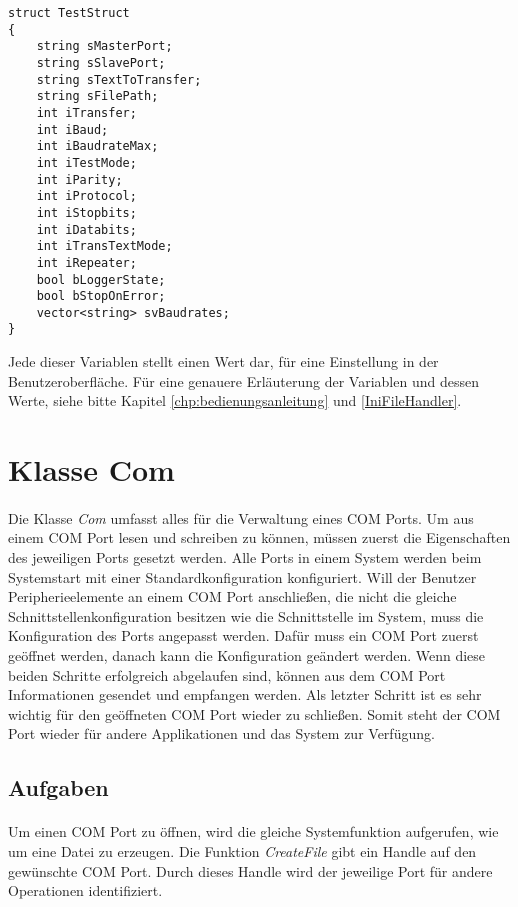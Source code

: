 \begin{lstlisting}	 
struct TestStruct
{
	string sMasterPort;
	string sSlavePort;
	string sTextToTransfer;
	string sFilePath;
	int iTransfer;
	int iBaud;
	int iBaudrateMax;
	int iTestMode;
	int iParity;
	int iProtocol;
	int iStopbits;
	int iDatabits;
	int iTransTextMode;
	int iRepeater;
	bool bLoggerState;
	bool bStopOnError;
	vector<string> svBaudrates;
}
\end{lstlisting}

Jede dieser Variablen stellt einen Wert dar, für eine Einstellung in der Benutzeroberfläche. Für eine genauere Erläuterung der Variablen und dessen Werte, siehe bitte Kapitel \ref{chp:bedienungsanleitung} und \ref{IniFileHandler}.

\newpage


\section{Klasse Com}
\paragraph{}
Die Klasse \textit{Com} umfasst alles für die Verwaltung eines COM Ports. Um aus einem COM Port lesen und schreiben zu können, müssen zuerst die Eigenschaften des jeweiligen Ports gesetzt werden. Alle Ports in einem System werden beim Systemstart mit einer Standardkonfiguration konfiguriert. Will der Benutzer Peripherieelemente an einem COM Port anschließen, die nicht die gleiche Schnittstellenkonfiguration besitzen wie die Schnittstelle im System, muss die Konfiguration des Ports angepasst werden. Dafür muss ein COM Port zuerst geöffnet werden, danach kann die Konfiguration geändert werden. Wenn diese beiden Schritte erfolgreich abgelaufen sind, können aus dem COM Port Informationen gesendet und empfangen werden. Als letzter Schritt ist es sehr wichtig für den geöffneten COM Port wieder zu schließen. Somit steht der COM Port wieder für andere Applikationen und das System zur Verfügung.\\

\subsection{Aufgaben}
\paragraph{}
Um einen COM Port zu öffnen, wird die gleiche Systemfunktion aufgerufen, wie um eine Datei zu erzeugen. Die Funktion \textit{CreateFile} gibt ein Handle auf den gewünschte COM Port. Durch dieses Handle wird der jeweilige Port für andere Operationen identifiziert.

